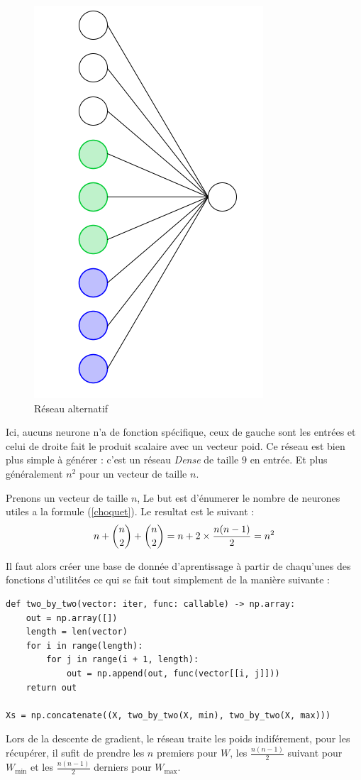 \begin{figure}[H]
    \center
    \includegraphics[height=\petit]{pict/net3.png}
	\caption{Réseau alternatif}
	\label{fig:net3}
\end{figure}
\vspace{-12pt}
Ici, aucuns neurone n'a de fonction spécifique, ceux de gauche sont les entrées
et celui de droite fait le produit scalaire avec un vecteur poid.
Ce réseau est bien plus simple à générer : c'est un réseau \emph{Dense} de taille $9$ en entrée.
Et plus généralement $n^2$ pour un vecteur de taille $n$.


{
Prenons un vecteur de taille $n$,
Le but est d'énumerer le nombre de neurones utiles a la formule (\ref{choquet}).
Le resultat est le suivant :
\begin{equation}
    n + \dbinom{n}{2} + \dbinom{n}{2} = n + 2 \times \frac{n(n-1)}{2} = n^2
\end{equation}
}

Il faut alors créer une base de donnée d'aprentissage à partir de chaqu'unes des fonctions d'utilitées
ce qui se fait tout simplement de la manière suivante :
\begin{lstlisting}[Language=Python]
def two_by_two(vector: iter, func: callable) -> np.array:
    out = np.array([])
    length = len(vector)
    for i in range(length):
        for j in range(i + 1, length):
            out = np.append(out, func(vector[[i, j]]))
    return out

Xs = np.concatenate((X, two_by_two(X, min), two_by_two(X, max)))
\end{lstlisting}
Lors de la descente de gradient, le réseau traite les poids indiférement, pour les récupérer,
il sufit de prendre les $n$ premiers pour $W$,
les $\frac{n(n-1)}{2}$ suivant pour $W_{\min}$
et les $\frac{n(n-1)}{2}$ derniers pour $W_{\max}$.